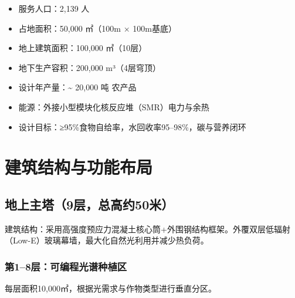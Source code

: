 \begin{itemize}
\item
  服务人口：2,139 人
\item
  占地面积：50,000 ㎡（100m × 100m基底）
\item
  地上建筑面积：100,000 ㎡（10层）
\item
  地下生产容积：200,000 m³（4层穹顶）
\item
  设计年产量：\textasciitilde{} 20,000 吨 农产品
\item
  能源：外接小型模块化核反应堆（SMR）电力与余热
\item
  设计目标：≥95\%食物自给率，水回收率95--98\%，碳与营养闭环
\end{itemize}

\section{建筑结构与功能布局}\label{ux5efaux7b51ux7ed3ux6784ux4e0eux529fux80fdux5e03ux5c40}

\subsection{地上主塔（9层，总高约50米）}\label{ux5730ux4e0aux4e3bux58549ux5c42ux603bux9ad8ux7ea650ux7c73}

建筑结构：采用高强度预应力混凝土核心筒+外围钢结构框架。外覆双层低辐射（Low-E）玻璃幕墙，最大化自然光利用并减少热负荷。

\subsubsection{第1--8层：可编程光谱种植区}\label{ux7b2c18ux5c42ux53efux7f16ux7a0bux5149ux8c31ux79cdux690dux533a}

每层面积10,000㎡，根据光需求与作物类型进行垂直分区。

